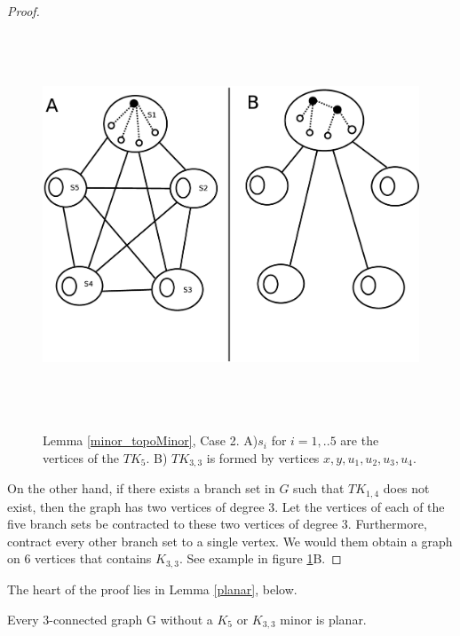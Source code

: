 \begin{proof}
\begin{figure}[htbp]
	\centering
	\includegraphics[height=4.5in]{minor_topoMinorCase2.eps} \\ 
	\caption{Lemma \ref{minor_topoMinor}, Case 2. A)$s_i$ for $i=1,..5$ are the vertices of the $TK_5$. B) $TK_{3,3}$ is formed by vertices $x,y,u_1,u_2,u_3,u_4$.}
\label{minor_topoMinorCase2}
\end{figure}

On the other hand, if there exists a branch set in $G$ such that $TK_{1,4}$ does not exist, then the graph has two vertices of degree 3. Let the vertices of each of the five branch sets be contracted to these two vertices of degree 3. Furthermore, contract every other branch set to a single vertex. We would them obtain a graph on 6 vertices that contains $K_{3,3}$. See example in figure \ref{minor_topoMinorCase2}B.
\end{proof}





The heart of the proof lies in Lemma \ref{planar}, below.
\begin{lemma}\label{planar}
Every 3-connected graph G without a $K_5$ or $K_{3,3}$ minor is planar. 
\end{lemma}

